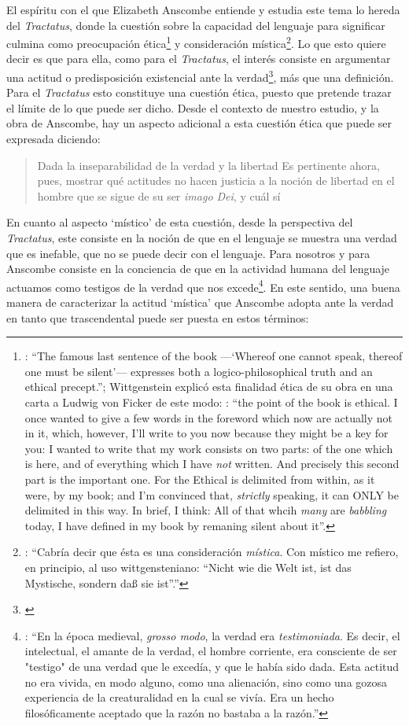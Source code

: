 El espíritu con el que Elizabeth Anscombe entiende y estudia este tema lo hereda del \emph{Tractatus}, donde la cuestión sobre la capacidad del lenguaje para significar culmina como preocupación ética\footnote{\cite[Cf.][156]{monk1991duty}: \enquote{The famous last sentence of the book ---`Whereof one cannot speak, thereof one must be silent'--- expresses both a logico-philosophical truth and an ethical precept.}; Wittgenstein explicó esta finalidad ética de su obra en una carta a Ludwig von Ficker de este modo: \cite[22-23]{monk2005howto}: \enquote{the point of the book is ethical. I once wanted to give a few words in the foreword which now are actually not in it, which, however, I'll write to you now because they might be a key for you: I wanted to write that my work consists on two parts: of the one which is here, and of everything which I have \emph{not} written. And precisely this second part is the important one. For the Ethical is delimited from within, as it were, by my book; and I'm convinced that, \emph{strictly} speaking, it can ONLY be delimited in this way. In brief, I think: All of that whcih \emph{many} are \emph{babbling} today, I have defined in my book by remaning silent about it}.} y consideración mística\footnote{\Cite[357]{dominguez2009at}: \enquote{Cabría decir que ésta es una consideración \emph{mística}. Con místico me refiero, en principio, al uso wittgensteniano: ``Nicht wie die Welt ist, ist das Mystische, sondern daß sie ist''.}}. Lo que esto quiere decir es que para ella, como para el \emph{Tractatus}, el interés consiste en argumentar una actitud o predisposición existencial ante la verdad\footnote{\Cite[Cf.][354-355]{dominguez2009at}}, más que una definición. Para el \emph{Tractatus} esto constituye una cuestión ética, puesto que pretende trazar el límite de lo que puede ser dicho. Desde el contexto de nuestro estudio, y la obra de Anscombe, hay un aspecto adicional a esta cuestión ética que puede ser expresada diciendo: \blockquote[{\Cite[354]{dominguez2009at}}]{Dada la inseparabilidad de la verdad y la libertad \textelp{} Es pertinente ahora, pues, mostrar qué actitudes  no hacen justicia a la noción de libertad en el hombre que se sigue de su ser \emph{imago Dei}, y cuál sí}. En cuanto al aspecto `místico' de esta cuestión, desde la perspectiva del \emph{Tractatus}, este consiste en la noción de que en el lenguaje se muestra una verdad que es inefable, que no se puede decir con el lenguaje. Para nosotros y para Anscombe consiste en la conciencia de que en la actividad humana del lenguaje actuamos como testigos de la verdad que nos excede\footnote{\Cite[Cf.][354-355]{dominguez2009at}: \enquote{En la época medieval, \emph{grosso modo}, la verdad era \emph{testimoniada}. Es decir, el intelectual, el amante de la verdad, el hombre corriente, era consciente de ser "testigo" de una verdad que le excedía, y que le había sido dada. Esta actitud no era vivida, en modo alguno, como una alienación, sino como una gozosa experiencia de la creaturalidad en la cual se vivía. Era un hecho filosóficamente aceptado que la razón no bastaba a la razón.}}. En este sentido, una buena manera de caracterizar la actitud `mística' que Anscombe adopta ante la verdad en tanto que trascendental puede ser puesta en estos términos: 